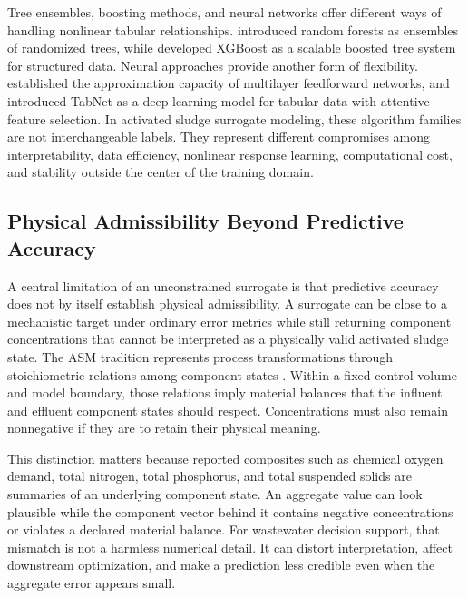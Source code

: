 \documentclass[12pt, twoside]{book}
\begin{document}
Tree ensembles, boosting methods, and neural networks offer different ways of handling nonlinear tabular
relationships. \citet{Breiman2001} introduced random forests as ensembles of randomized trees, while
\citet{ChenGuestrin2016} developed XGBoost as a scalable boosted tree system for structured data. Neural
approaches provide another form of flexibility. \citet{Hornik1989} established the approximation capacity of
multilayer feedforward networks, and \citet{ArikPfister2021} introduced TabNet as a deep learning model for
tabular data with attentive feature selection. In activated sludge surrogate modeling, these algorithm families
are not interchangeable labels. They represent different compromises among interpretability, data efficiency,
nonlinear response learning, computational cost, and stability outside the center of the training domain.

\subsection{Physical Admissibility Beyond Predictive Accuracy}

A central limitation of an unconstrained surrogate is that predictive accuracy does not by itself establish
physical admissibility. A surrogate can be close to a mechanistic target under ordinary error metrics while
still returning component concentrations that cannot be interpreted as a physically valid activated sludge
state. The ASM tradition represents process transformations through stoichiometric relations among component
states \citep{Henze1999,Henze2006}. Within a fixed control volume and model boundary, those relations imply
material balances that the influent and effluent component states should respect. Concentrations must also
remain nonnegative if they are to retain their physical meaning.

This distinction matters because reported composites such as chemical oxygen demand, total nitrogen, total
phosphorus, and total suspended solids are summaries of an underlying component state. An aggregate value can
look plausible while the component vector behind it contains negative concentrations or violates a declared
material balance. For wastewater decision support, that mismatch is not a harmless numerical detail. It can
distort interpretation, affect downstream optimization, and make a prediction less credible even when the
aggregate error appears small.
\end{document}
